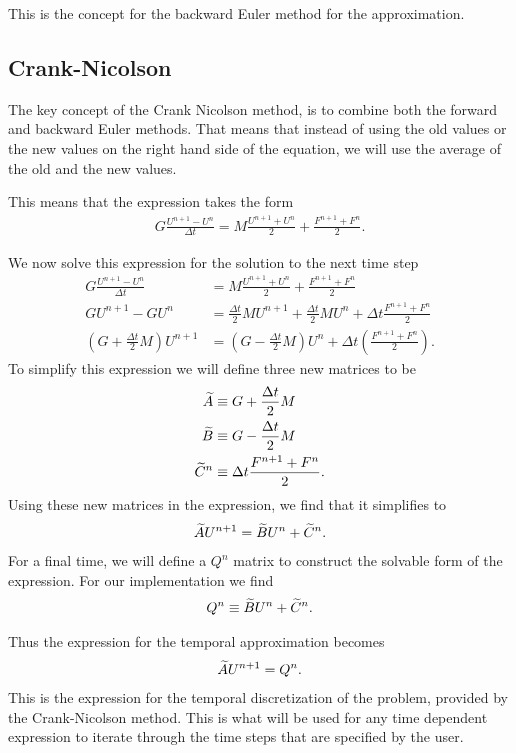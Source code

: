 \documentclass[../fem.tex]{subfile}
\begin{document}
This is the concept for the backward Euler method for the approximation.

\subsection{Crank-Nicolson}%
\label{sub:crank_nicolson}

The key concept of the Crank Nicolson method, is to combine both the forward
and backward Euler methods. That means that instead of using the old values or
the new values on the right hand side of the equation, we will use the average
of the old and the new values.

This means that the expression takes the form
\begin{align*}
  G\frac{U^{n+1}-U^n}{\Delta t}=M\frac{U^{n+1}+U^n}{2}+\frac{F^{n+1}+F^n}{2}.
\end{align*}

We now solve this expression for the solution to the next time step
\begin{align*}
  G\frac{U^{n+1}-U^n}{\Delta t}&=M\frac{U^{n+1}+U^n}{2}+\frac{F^{n+1}+F^n}{2}\\
  GU^{n+1}-GU^n&=\frac{\Delta t}{2}MU^{n+1}+\frac{\Delta t}{2}MU^n+\Delta
  t\frac{F^{n+1}+F^n}{2}\\
  \left(G+\frac{\Delta t}{2}M\right)U^{n+1}&=\left(G-\frac{\Delta
    t}{2}M\right)U^n+\Delta t\left(\frac{F^{n+1}+F^n}{2}\right).
\end{align*}
To simplify this expression we will define three new matrices to be
\begin{align*}
  \widetilde{A}&\equiv G+\frac{\Delta t}{2}M\\
  \widetilde{B}&\equiv G-\frac{\Delta t}{2}M\\
  \widetilde{C}^n&\equiv \Delta t\frac{F^{n+1}+F^n}{2}.
\end{align*}
Using these new matrices in the expression, we find that it simplifies to
\begin{align*}
  \widetilde{A}U^{n+1}=\widetilde{B}U^n+\widetilde{C}^n.
\end{align*}
For a final time, we will define a $Q^n$ matrix to construct the solvable form
of the expression. For our implementation we find
\begin{align*}
  Q^n\equiv\widetilde{B}U^n+\widetilde{C}^n.
\end{align*}

Thus the expression for the temporal approximation becomes
\begin{align*}
  \widetilde{A}U^{n+1}=Q^n.
\end{align*}
This is the expression for the temporal discretization of the problem, provided
by the Crank-Nicolson method. This is what will be used for any time dependent
expression to iterate through the time steps that are specified by the user.
\end{document}
